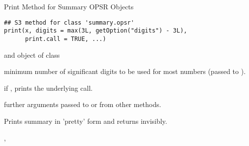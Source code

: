 
%
\begin{Description}
Print Method for Summary OPSR Objects
\end{Description}
%
\begin{Usage}
\begin{verbatim}
## S3 method for class 'summary.opsr'
print(x, digits = max(3L, getOption("digits") - 3L),
      print.call = TRUE, ...)
\end{verbatim}
\end{Usage}
%
\begin{Arguments}
\begin{ldescription}
\item[\code{x}] and object of class 

\item[\code{digits}] minimum number of significant digits to be used for most numbers (passed to ).

\item[\code{print.call}] if , prints the underlying  call.

\item[\code{...}] further arguments passed to or from other methods.
\end{ldescription}
\end{Arguments}
%
\begin{Value}
Prints summary in 'pretty' form and returns  invisibly.
\end{Value}
%
\begin{SeeAlso}
, 
\end{SeeAlso}


